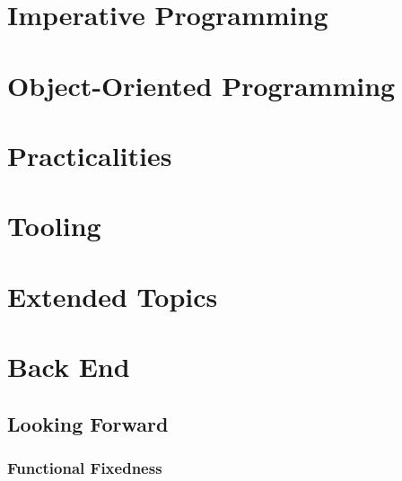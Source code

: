 \nocite{planetarysolvency}






\part{Imperative Programming}
\label{part:ip}









\part{Object-Oriented Programming}
\label{part:oo}







\part{Practicalities}
\label{part:prac}





\part{Tooling}
\label{part:tool}






\part{Extended Topics}





\part{Back End}
\appendix

\chapter{Looking Forward}

\section{Functional Fixedness}

